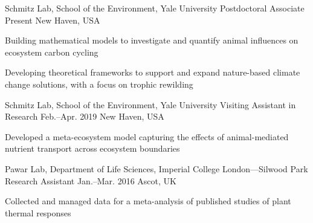 

\begin{cventries}

  \cventry
    {Schmitz Lab, School of the Environment, Yale University} %
    {Postdoctoral Associate} %
    {Present} %
    {New Haven, USA} %
    {
      \begin{cvitems} %
        \item {Building mathematical models to investigate and quantify animal influences on ecosystem carbon cycling}
        \item {Developing theoretical frameworks to support and expand nature-based climate change solutions, with a focus on trophic rewilding}
      \end{cvitems} 
    }

  \cventry
    {Schmitz Lab, School of the Environment, Yale University} %
    {Visiting Assistant in Research} %
    {Feb.--Apr. 2019} %
    {New Haven, USA} %
    {
      \begin{cvitems} %
        \item {Developed a meta-ecosystem model capturing the effects of animal-mediated nutrient transport across ecosystem boundaries}
      \end{cvitems}  
    }

  \cventry
    {Pawar Lab, Department of Life Sciences, Imperial College London---Silwood Park} %
    {Research Assistant} %
    {Jan.--Mar. 2016} %
    {Ascot, UK} %
    {
      \begin{cvitems} %
        \item {Collected and managed data for a meta-analysis of published studies of plant thermal responses}
      \end{cvitems}  
    }


\end{cventries}

